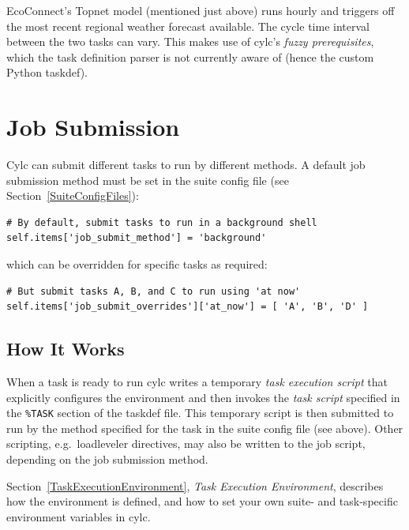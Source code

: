 \documentclass[11pt,a4paper]{article}
\begin{document}
EcoConnect's Topnet model (mentioned just above) runs hourly and
triggers off the most recent regional weather forecast available.
The cycle time interval between the two tasks can vary. This makes 
use of cylc's {\em fuzzy prerequisites}, which the task definition
parser is not currently aware of (hence the custom Python taskdef).

\pagebreak
\section{Job Submission}
\label{JobSubmission}

Cylc can submit different tasks to run by different methods.  A default
job submission method must be set in the suite config file (see
Section~\ref{SuiteConfigFiles}):
 
\lstset{language=Python}

\begin{lstlisting}
# By default, submit tasks to run in a background shell
self.items['job_submit_method'] = 'background'
\end{lstlisting}
 
which can be overridden for specific tasks as required:

\begin{lstlisting}
# But submit tasks A, B, and C to run using 'at now'
self.items['job_submit_overrides']['at_now'] = [ 'A', 'B', 'D' ]
\end{lstlisting}

\subsection{How It Works}
\label{HowItWorks}

\lstset{language=cylctaskdef}

When a task is ready to run cylc writes a temporary {\em task execution
script} that explicitly configures the environment and then invokes the
{\em task script} specified in the \lstinline=%TASK= section of the
taskdef file. This temporary script is then submitted to run by the
method specified for the task in the suite config file (see above).
Other scripting, e.g.\ loadleveler directives, may also be written to
the job script, depending on the job submission method.

\lstset{language=bash}

Section~\ref{TaskExecutionEnvironment}, {\em Task Execution
Environment}, describes how the environment is defined, and how to set
your own suite- and task-specific environment variables in cylc.
\end{document}
